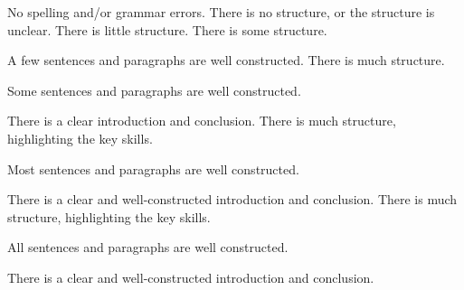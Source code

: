 \documentclass{../fal_assignment}
\begin{document}
\begin{markingrubric}
        \grade 		No spelling and/or grammar errors.
%
        \grade\fail 	There is no structure, or the structure is unclear.
        \grade 		There is little structure.
        \grade 		There is some structure.
        \par 		A few sentences and paragraphs are well constructed.
        \grade 		There is much structure.
        \par 		Some sentences and paragraphs are well constructed.
        \par 		There is a clear introduction and conclusion.
        \grade 		There is much structure, highlighting the key skills.
        \par 		Most sentences and paragraphs are well constructed.
        \par 		There is a clear and well-constructed introduction and conclusion.
        \grade 		There is much structure, highlighting the key skills.
        \par 		All sentences and paragraphs are well constructed.
        \par 		There is a clear and well-constructed introduction and conclusion.
\end{markingrubric}
\end{document}
